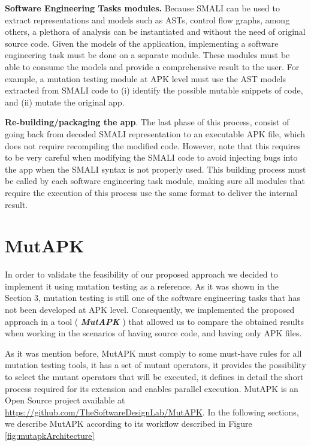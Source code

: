 \textbf{Software Engineering Tasks modules.} Because SMALI can be used to extract representations and models such as ASTs, control flow graphs, among others, a plethora of analysis can be instantiated and without the need of original source code. Given the models of the application, implementing a software engineering task must be done on a separate module. These modules must be able to consume the models and provide a comprehensive result to the user. For example, a mutation testing module at APK level must use the AST models extracted from SMALI code to (i) identify the possible mutable snippets of code, and (ii) mutate the original app.


\textbf{Re-building/packaging the app}.
The last phase of this process, consist of going back from decoded SMALI representation to an executable APK file, which does not require recompiling the modified code. However, note that this requires to be very careful when modifying the SMALI code to avoid injecting bugs into the app when the SMALI syntax is not properly used.%
This building process must be called by each software engineering task module, making sure all modules that require the execution of this process use the same format to deliver the internal result.



\section{MutAPK}

In order to validate the feasibility of our proposed approach we decided to implement it using mutation testing as a reference. As it was shown in the Section 3, mutation testing is still one of the software engineering tasks that has not been developed at APK level. Consequently, we implemented the proposed approach in a tool ( \textit{\textbf{MutAPK}} ) that allowed us to compare the obtained results when working in the scenarios of having source code, and having only APK files.

As it was mention before, MutAPK must comply to some must-have rules for all mutation testing tools, it has a set of mutant operators, it provides the possibility to select the mutant operators that will be executed, it defines in detail the short process required for its extension and enables parallel execution. MutAPK is an Open Source project available at \url{https://github.com/TheSoftwareDesignLab/MutAPK}. In the following sections, we describe MutAPK according to its workflow described in Figure \ref{fig:mutapkArchitecture}


